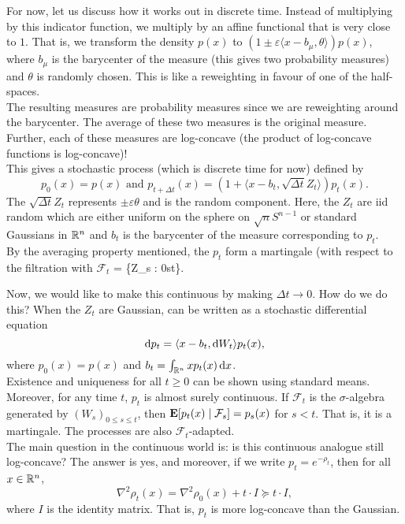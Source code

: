 For now, let us discuss how it works out in discrete time. Instead of multiplying by this indicator function, we multiply by an affine functional that is very close to $1$. That is, we transform the density $p(x)$ to $(1\pm\varepsilon\langle x-b_\mu,\theta\rangle)p(x)$, where $b_\mu$ is the barycenter of the measure (this gives two probability measures) and $\theta$ is randomly chosen. This is like a reweighting in favour of one of the half-spaces.\\
The resulting measures are probability measures since we are reweighting around the barycenter. The average of these two measures is the original measure. Further, each of these measures are log-concave (the product of log-concave functions is log-concave)!\\
This gives a stochastic process (which is discrete time for now) defined by
\begin{equation}
	\label{eqn: discrete time stochastic localization}
	p_0(x) = p(x) \text{ and } p_{t+\Delta t}(x) = (1 + \langle x-b_t,\sqrt{\Delta t}Z_t\rangle) p_t(x).
\end{equation}
The $\sqrt{\Delta t}Z_t$ represents $\pm \varepsilon\theta$ and is the random component. Here, the $Z_t$ are iid random which are either uniform on the sphere on $\sqrt{n}S^{n-1}$ or standard Gaussians in $\mathbb{R}^n$ and $b_t$ is the barycenter of the measure corresponding to $p_t$.\\
By the averaging property mentioned, the $p_t$ form a martingale (with respect to the filtration with $\mathcal{F}_t$ = \sigma\{Z_s : 0\leq s\leq t\}.

Now, we would like to make this continuous by making $\Delta t\to 0$. How do we do this? When the $Z_t$ are Gaussian,  can be written as a stochastic differential equation
\[ \operatorname{d}\!{p}_t = \langle x-b_t,\operatorname{d}\!{W}_t\rangle p_t(x), \]
where $p_0(x)=p(x)$ and $b_t = \int_{\mathbb{R}^n} x p_t(x) \operatorname{d}\!{x}$.\\
Existence and uniqueness for all $t\geq 0$ can be shown using standard means. Moreover, for any time $t$, $p_t$ is almost surely continuous. If $\mathcal{F}_t$ is the $\sigma$-algebra generated by $(W_s)_{0\leq s\leq t}$, then $\textbf{E}[p_t(x) \mid \mathcal{F}_s] = p_s(x)$ for $s<t$. That is, it is a martingale. The processes are also $\mathcal{F}_t$-adapted.\\
The main question in the continuous world is: is this continuous analogue still log-concave? The answer is yes, and moreover, if we write $p_t = e^{-\rho_t}$, then for all $x\in\mathbb{R}^n$,
\[ \nabla^2 \rho_t(x) = \nabla^2\rho_0(x) + t\cdot I \succeq t\cdot I, \]
where $I$ is the identity matrix. That is, $p_t$ is more log-concave than the Gaussian.